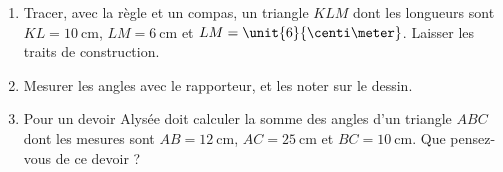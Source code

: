 
\begin{exercice}\label{exosmath-0823}

    \begin{enumerate}
        \item
            Tracer, avec la règle et un compas, un triangle \( KLM\) dont les longueurs sont \( KL=\SI{10}{\centi\meter}\), \( LM=\SI{6}{\centi\meter}\) et \( LM=\unit{6}{\centi\meter}\). Laisser les traits de construction.
        \item
            Mesurer les angles avec le rapporteur, et les noter sur le dessin.
        \item
            Pour un devoir Alysée doit calculer la somme des angles d'un triangle \( ABC\) dont les mesures sont \( AB=\SI{12}{\centi\meter}\), \( AC=\SI{25}{\centi\meter}\) et \( BC=\SI{10}{\centi\meter}\). Que pensez-vous de ce devoir ?
    \end{enumerate}

\end{exercice}
